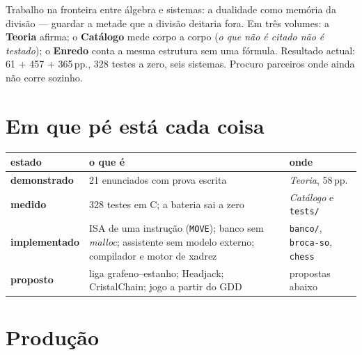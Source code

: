 \documentclass[11pt,a4paper]{article}
\begin{document}
Trabalho na fronteira entre álgebra e sistemas: a dualidade como memória da divisão ---
guardar a metade que a divisão deitaria fora. Em três volumes: a \textbf{Teoria} afirma;
o \textbf{Catálogo} mede corpo a corpo (\emph{o que não é citado não é testado}); o
\textbf{Enredo} conta a mesma estrutura sem uma fórmula. Resultado actual: 61 + 457 + 365\,pp.,
328 testes a zero, seis sistemas. Procuro parceiros onde ainda não corre sozinho.

\section*{Em que pé está cada coisa}

\begin{center}\footnotesize
\begin{tabular}{@{}p{2.3cm}p{8.0cm}p{4.2cm}@{}}
\toprule
\textbf{estado} & \textbf{o que é} & \textbf{onde} \\
\midrule
\textbf{demonstrado} &
21 enunciados com prova escrita &
\emph{Teoria}, 58\,pp. \\[1pt]
\textbf{medido} &
328 testes em C; a bateria sai a zero &
\emph{Catálogo} e \texttt{tests/} \\[1pt]
\textbf{implementado} &
ISA de uma instrução (\texttt{MOVE}); banco sem \emph{malloc};
assistente sem modelo externo; compilador e motor de xadrez &
\texttt{banco/}, \texttt{broca-so}, \texttt{chess} \\[1pt]
\textbf{proposto} &
liga grafeno--estanho; Headjack; CristalChain; jogo a partir do GDD &
propostas abaixo \\
\bottomrule
\end{tabular}
\end{center}

\section*{Produção}
\end{document}
